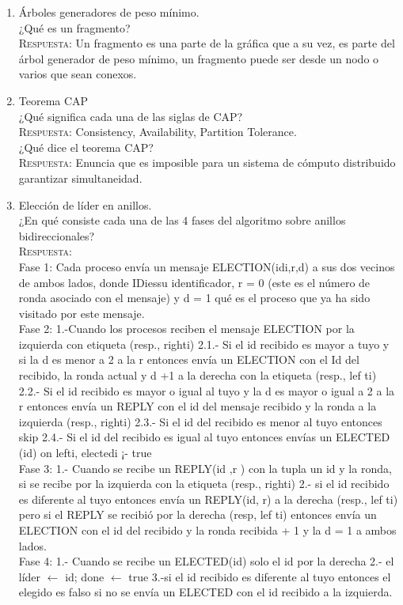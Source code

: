 \documentclass[letterpaper,10pt]{article}
\begin{document}
\begin{enumerate}
    \item Árboles generadores de peso mínimo.\\

	¿Qué es un fragmento?\\
    \textsc{Respuesta:}
   	Un fragmento es una parte de la gráfica que a su vez, es parte del árbol generador de peso mínimo, un fragmento puede ser desde un nodo o varios que sean conexos.\\
   	
   	
    \item Teorema CAP \\
    
    ¿Qué significa cada una de las siglas de CAP?\\
    \textsc{Respuesta:}
  	Consistency, Availability, Partition Tolerance. \\
  	
  	¿Qué dice el teorema CAP?\\
	\textsc{Respuesta:}
  	Enuncia que es imposible para un sistema de cómputo distribuido garantizar simultaneidad.\\
    
    \item Elección de líder en anillos.\\

	¿En qué consiste cada una de las 4 fases del algoritmo sobre anillos bidireccionales?\\
    \textsc{Respuesta:}\\
   	Fase 1: Cada proceso envía un mensaje ELECTION(idi,r,d) a sus dos vecinos de ambos lados, donde IDiessu identificador, r = 0 (este es el número de ronda asociado con el mensaje) y d = 1 qué es el proceso que ya ha sido visitado por este mensaje.\\
Fase 2: 1.-Cuando los procesos reciben el mensaje ELECTION por la izquierda con etiqueta (resp., righti) 
2.1.- Si el id recibido es mayor a tuyo y si la d es menor a 2 a la r entonces envía un ELECTION con el Id del recibido, la ronda actual y d +1 a la derecha con la etiqueta (resp., lef ti)
2.2.- Si el id recibido es mayor o igual al tuyo y la d es mayor o igual a 2 a la r entonces envía un REPLY con el id del mensaje recibido y la ronda a la izquierda (resp., righti)
2.3.- Si el id del recibido es menor al tuyo entonces skip
2.4.- Si el id del recibido es igual al tuyo entonces envías un ELECTED (id) on lefti, electedi ¡- true\\
Fase 3: 1.- Cuando se recibe un REPLY(id ,r ) con la tupla un id y la ronda, si se recibe por la izquierda con la etiqueta (resp., righti)
2.- si el id recibido es diferente al tuyo entonces envía un REPLY(id, r) a la derecha (resp., lef ti) pero si el REPLY se recibió por la derecha (resp, lef ti) entonces envía un ELECTION con el id del recibido y la ronda recibida + 1 y la d = 1 a ambos lados.\\
Fase 4: 1.- Cuando se recibe un ELECTED(id) solo el id por la derecha
2.- el líder $\leftarrow$ id; done $\leftarrow$ true
3.-si el id recibido es diferente al tuyo entonces el elegido es falso si no se envía un ELECTED con el id recibido a la izquierda. \\


\end{enumerate}
\end{document}
